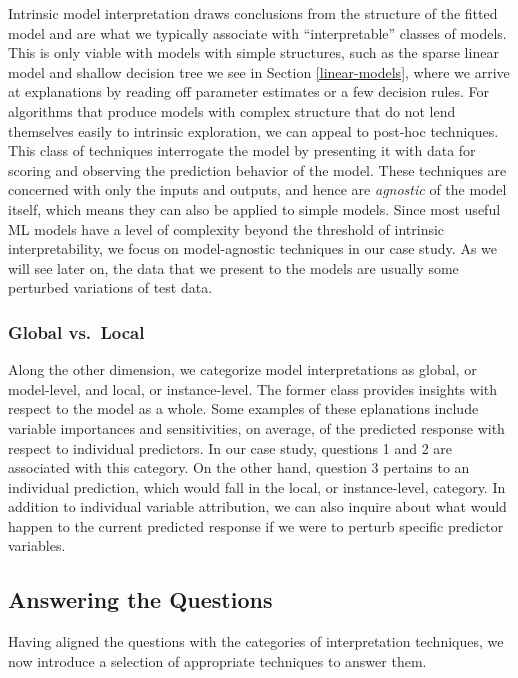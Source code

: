 \documentclass[preprint, 3p, twocolumn, letterpaper, 10pt]{elsarticle} %
\begin{document}
Intrinsic model interpretation draws conclusions from the structure of the
fitted model and are what we typically associate with ``interpretable'' classes
of models. This is only viable with models with simple structures, such as the
sparse linear model and shallow decision tree we see in Section
\ref{linear-models}, where we arrive at explanations by reading off parameter
estimates or a few decision rules. For algorithms that produce models
with complex structure that do not lend themselves easily to intrinsic
exploration, we can appeal to post-hoc techniques. This class of techniques
interrogate the model by presenting it with data for scoring and observing the
prediction behavior of the model. These techniques are concerned with only the
inputs and outputs, and hence are \emph{agnostic} of the model itself, which means
they can also be applied to simple models. Since most useful ML models have a
level of complexity beyond the threshold of intrinsic interpretability, we focus
on model-agnostic techniques in our case study. As we will see later on, the
data that we present to the models are usually some perturbed variations of test
data.

\hypertarget{global-vs.local}{%
\subsubsection{Global vs.~Local}\label{global-vs.local}}

Along the other dimension, we categorize model interpretations as global, or
model-level, and local, or instance-level. The former class provides insights
with respect to the model as a whole. Some examples of these eplanations include
variable importances and sensitivities, on average, of the predicted response
with respect to individual predictors. In our case study, questions 1 and 2 are
associated with this category. On the other hand, question 3 pertains to an
individual prediction, which would fall in the local, or instance-level,
category. In addition to individual variable attribution, we can also inquire
about what would happen to the current predicted response if we were to perturb
specific predictor variables.

\hypertarget{answering-the-questions}{%
\subsection{Answering the Questions}\label{answering-the-questions}}

Having aligned the questions with the categories of interpretation techniques,
we now introduce a selection of appropriate techniques to answer them.
\end{document}
